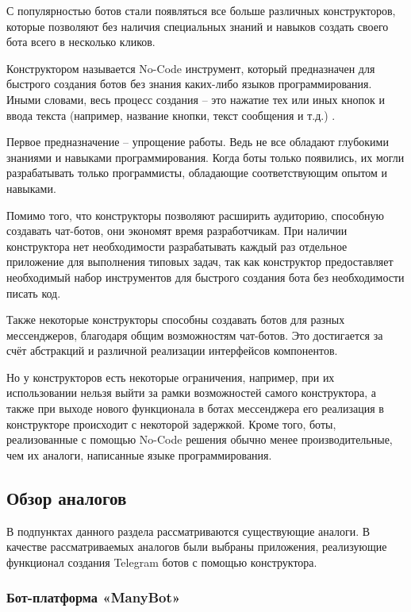 С популярностью ботов стали появляться все больше различных
конструкторов, которые позволяют
без наличия специальных знаний и
навыков создать своего бота всего в несколько кликов.

Конструктором называется No-Code инструмент, который
предназначен для
быстрого создания ботов без знания каких-либо языков программирования.
Иными словами, весь процесс создания – это нажатие тех или иных кнопок и
ввода текста (например, название кнопки, текст сообщения и т.д.) .

Первое предназначение – упрощение работы. Ведь не все обладают
глубокими знаниями и навыками программирования. Когда боты только
появились, их могли разрабатывать только программисты, обладающие
соответствующим опытом и навыками.

Помимо того, что конструкторы позволяют расширить аудиторию,
способную создавать чат-ботов, они экономят время разработчикам. При
наличии конструктора нет необходимости разрабатывать каждый раз
отдельное приложение для выполнения типовых
задач, так как конструктор предоставляет необходимый
набор инструментов для быстрого создания бота
без необходимости писать код.

Также некоторые конструкторы способны создавать ботов для разных мессенджеров,
благодаря общим возможностям чат-ботов. Это достигается за счёт
абстракций и различной реализации интерфейсов компонентов.

Но у конструкторов есть некоторые ограничения, например, при их
использовании нельзя выйти за рамки возможностей самого конструктора, а
также при выходе нового функционала в ботах мессенджера его реализация в
конструкторе происходит с некоторой задержкой. Кроме того, боты,
реализованные с помощью No-Code решения обычно менее производительные,
чем их аналоги, написанные языке программирования.


\subsection{Обзор аналогов}

В подпунктах данного раздела рассматриваются существующие аналоги.
В качестве рассматриваемых аналогов были выбраны приложения,
реализующие функционал создания Telegram ботов с помощью конструктора.


\subsubsection{Бот-платформа «ManyBot»}


